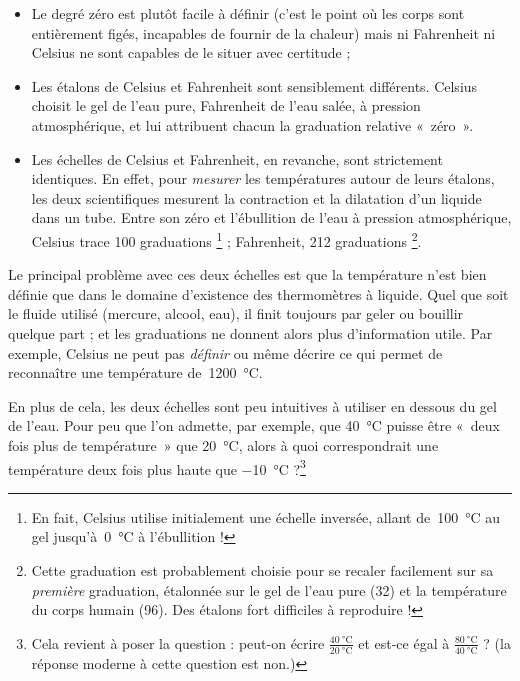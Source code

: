 		\begin{itemize}
			\item Le degré zéro est plutôt facile à définir (c’est le point où les corps sont entièrement figés, incapables de fournir de la chaleur) mais ni Fahrenheit ni Celsius ne sont capables de le situer avec certitude ;
			\item Les étalons de Celsius et Fahrenheit sont sensiblement différents. Celsius choisit le gel de l’eau pure, Fahrenheit de l’eau salée, à pression atmosphérique, et lui attribuent chacun la graduation relative «~zéro~».
			\item Les échelles de Celsius et Fahrenheit, en revanche, sont strictement identiques. En effet, pour \emph{mesurer} les températures autour de leurs étalons, les deux scientifiques mesurent la contraction et la dilatation d’un liquide dans un tube. Entre son zéro et l’ébullition de l’eau à pression atmosphérique, Celsius trace 100 graduations%
			\footnote{En fait, Celsius utilise initialement une échelle inversée, allant de~\SI{100}{\celsius} au gel jusqu’à~\SI{0}{\celsius} à l’ébullition !} ; Fahrenheit, 212 graduations%
			\footnote{Cette graduation est probablement choisie pour se recaler facilement sur sa \emph{première} graduation, étalonnée sur le gel de l’eau pure (32) et la température du corps humain (96). Des étalons fort difficiles à reproduire !}.
		\end{itemize}
		
		Le principal problème avec ces deux échelles est que la température n’est bien définie que dans le domaine d’existence des thermomètres à liquide. Quel que soit le fluide utilisé (mercure, alcool, eau), il finit toujours par geler ou bouillir quelque part ; et les graduations ne donnent alors plus d’information utile. Par exemple, Celsius ne peut pas \emph{définir} ou même décrire ce qui permet de reconnaître une température de~\SI{1200}{\celsius}.
		
		En plus de cela, les deux échelles sont peu intuitives à utiliser en dessous du gel de l’eau. Pour peu que l’on admette, par exemple, que \SI{40}{\celsius} puisse être «~deux fois plus de température~» que \SI{20}{\celsius}, alors à quoi correspondrait une température deux fois plus haute que \SI{-10}{\celsius} ?\footnote{Cela revient à poser la question : peut-on écrire $\frac{\SI{40}{\celsius}}{\SI{20}{\celsius}}$ et est-ce égal à $\frac{\SI{80}{\celsius}}{\SI{40}{\celsius}}$ ? (la réponse moderne à cette question est non.)}
		
		
	
